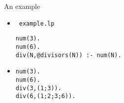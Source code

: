 \begin{frame}[fragile]{An example}
  \bigskip
  \begin{itemize}
  \item<1->  \ \texttt{example.lp}
\begin{lstlisting}
num(3).
num(6).
div(N,@divisors(N)) :- num(N).
\end{lstlisting}
  \bigskip
  \item<2-> 
\begin{lstlisting}
num(3).
num(6).
div(3,(1;3)).
div(6,(1;2;3;6)).
\end{lstlisting}
  \end{itemize}
\end{frame}

